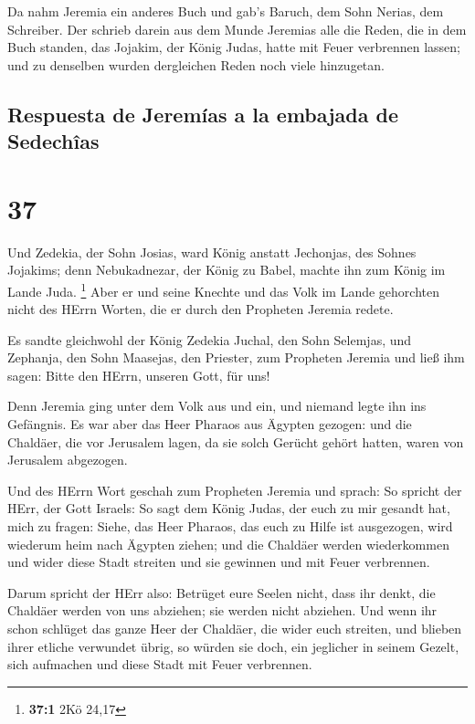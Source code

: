  Da nahm Jeremia ein anderes Buch und gab's Baruch, dem
Sohn Nerias, dem Schreiber. Der schrieb darein aus dem Munde Jeremias
alle die Reden, die in dem Buch standen, das Jojakim, der König Judas,
hatte mit Feuer verbrennen lassen; und zu denselben wurden dergleichen
Reden noch viele hinzugetan.

\hypertarget{respuesta-de-jeremuxedas-a-la-embajada-de-sedechuxeeas}{%
\subsection{Respuesta de Jeremías a la embajada de
Sedechîas}\label{respuesta-de-jeremuxedas-a-la-embajada-de-sedechuxeeas}}

\hypertarget{section-36}{%
\section{37}\label{section-36}}

 Und Zedekia, der Sohn Josias, ward König anstatt
Jechonjas, des Sohnes Jojakims; denn Nebukadnezar, der König zu Babel,
machte ihn zum König im Lande Juda. \footnote{\textbf{37:1} 2Kö 24,17}
 Aber er und seine Knechte und das Volk im Lande
gehorchten nicht des HErrn Worten, die er durch den Propheten Jeremia
redete.

 Es sandte gleichwohl der König Zedekia Juchal, den Sohn
Selemjas, und Zephanja, den Sohn Maasejas, den Priester, zum Propheten
Jeremia und ließ ihm sagen: Bitte den HErrn, unseren Gott, für uns!

 Denn Jeremia ging unter dem Volk aus und ein, und niemand
legte ihn ins Gefängnis.  Es war aber das Heer Pharaos aus
Ägypten gezogen: und die Chaldäer, die vor Jerusalem lagen, da sie solch
Gerücht gehört hatten, waren von Jerusalem abgezogen.

 Und des HErrn Wort geschah zum Propheten Jeremia und
sprach:  So spricht der HErr, der Gott Israels: So sagt
dem König Judas, der euch zu mir gesandt hat, mich zu fragen: Siehe, das
Heer Pharaos, das euch zu Hilfe ist ausgezogen, wird wiederum heim nach
Ägypten ziehen;  und die Chaldäer werden wiederkommen und
wider diese Stadt streiten und sie gewinnen und mit Feuer verbrennen.

 Darum spricht der HErr also: Betrüget eure Seelen nicht,
dass ihr denkt, die Chaldäer werden von uns abziehen; sie werden nicht
abziehen.  Und wenn ihr schon schlüget das ganze Heer der
Chaldäer, die wider euch streiten, und blieben ihrer etliche verwundet
übrig, so würden sie doch, ein jeglicher in seinem Gezelt, sich
aufmachen und diese Stadt mit Feuer verbrennen.

